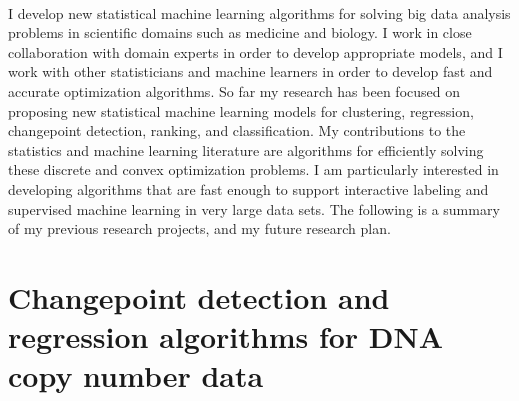 \documentclass{article}
\begin{document}
\mbox{ }




I develop new statistical machine learning algorithms for solving big
data analysis problems in scientific domains such as medicine and
biology. I work in close collaboration with domain experts in order to
develop appropriate models, and I work with other statisticians and
machine learners in order to develop fast and accurate optimization
algorithms. So far my research has been focused on proposing new
statistical machine learning models for clustering, regression,
changepoint detection, ranking, and classification. My contributions
to the statistics and machine learning literature are algorithms for
efficiently solving these discrete and convex optimization problems.
I am particularly interested in developing algorithms that are fast
enough to support interactive labeling and supervised machine learning
in very large data sets. The following is a summary of my previous
research projects, and my future research plan.

\section{Changepoint detection and regression algorithms for DNA copy
  number data}
\end{document}
